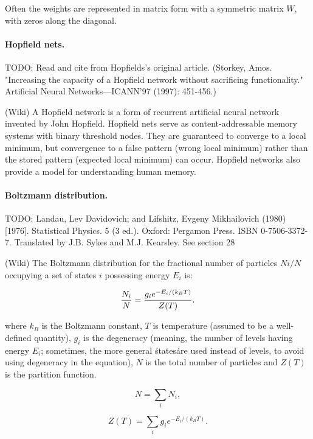 Often the weights are represented in matrix form with a symmetric matrix $W$, with zeros along the diagonal.

\paragraph{Hopfield nets.}

TODO: Read and cite from Hopfields's original article. (Storkey, Amos. "Increasing the capacity of a Hopfield network without sacrificing functionality." Artificial Neural Networks—ICANN'97 (1997): 451-456.)

(Wiki) A Hopfield network is a form of recurrent artificial neural network invented by John Hopfield. Hopfield nets serve as content-addressable memory systems with binary threshold nodes. They are guaranteed to converge to a local minimum, but convergence to a false pattern (wrong local minimum) rather than the stored pattern (expected local minimum) can occur. Hopfield networks also provide a model for understanding human memory.

\paragraph{Boltzmann distribution.}

TODO:  Landau, Lev Davidovich; and Lifshitz, Evgeny Mikhailovich (1980) [1976]. Statistical Physics. 5 (3 ed.). Oxford: Pergamon Press. ISBN 0-7506-3372-7. Translated by J.B. Sykes and M.J. Kearsley. See section 28

(Wiki) The Boltzmann distribution for the fractional number of particles $Ni / N$ occupying a set of states $i$ possessing energy $E_i$ is:

    $${N_i \over N} = {g_i e^{-E_i/(k_BT)} \over Z(T)}.$$

where $k_B$ is the Boltzmann constant, $T$ is temperature (assumed to be a well-defined quantity), $g_i$ is the degeneracy (meaning, the number of levels having energy $E_i$; sometimes, the more general \'states\' are used instead of levels, to avoid using degeneracy in the equation), $N$ is the total number of particles and $Z(T)$ is the partition function.

    $$N=\sum_i N_i,$$

    $$Z(T)=\sum_i g_i e^{-E_i/(k_BT)}. $$
